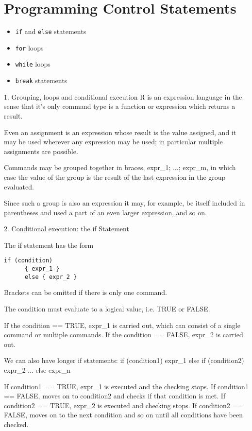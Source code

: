 \section{Programming Control Statements}


\begin{itemize}
\item \texttt{if} and \texttt{else} statements
\item \texttt{for} loops
\item \texttt{while} loops
\item \texttt{break} statements
\end{itemize}
1.	Grouping, loops and conditional execution
R is an expression language in the sense that it’s only command type is a function or expression which returns a result. 

Even an assignment is an expression whose result is the value assigned, and it may be used wherever any expression may be used; in particular multiple assignments are possible. 

Commands may be grouped together in braces, {expr_1; ...; expr_m}, in which case the value of the group is the result of the last expression in the group evaluated. 

Since such a group is also an expression it may, for example, be itself included in parentheses and used a part of an even larger expression, and so on.  

2.	Conditional execution: the if Statement

The if statement has the form 

\begin{verbatim}
if (condition)
      { expr_1 }
      else { expr_2 }
\end{verbatim}
Brackets can be omitted if there is only one command. 

The condition must evaluate to a logical value, i.e. TRUE or FALSE. 

If the condition == TRUE, expr_1 is carried out, which can consist of a single command or multiple commands. If the condition == FALSE, expr_2 is carried out.

We can also have longer if statements:
if (condition1)
  {expr_1}
  else if (condition2)
     {expr_2}
     ...
     else {expr_n}


If condition1 == TRUE, expr_1 is executed and the checking 
stops. If condition1 == FALSE, moves on to condition2 and checks if that condition is met. 
If condition2 == TRUE, expr_2 is executed and checking stops. If condition2 == FALSE, moves on to the next condition and so on until all conditions have been checked.

